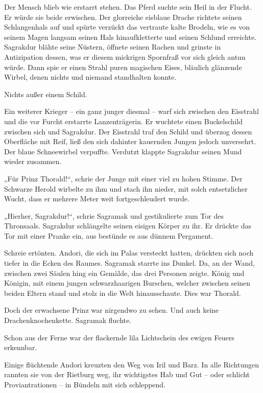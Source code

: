 Der Mensch blieb wie erstarrt stehen. Das Pferd suchte sein Heil in der Flucht. Er würde sie beide erwischen. Der glorreiche eisblaue Drache richtete seinen Schlangenhals auf und spürte verzückt das vertraute kalte Brodeln, wie es von seinem Magen langsam seinen Hals hinaufkletterte und seinen Schlund erreichte. Sagrakdur blähte seine Nüstern, öffnete seinen Rachen und grinste in Antizipation dessen, was er diesem mickrigen Spornfraß vor sich gleich antun würde. Dann spie er einen Strahl puren magischen Eises, bläulich glänzende Wirbel, denen nichts und niemand standhalten konnte.

Nichts außer einem Schild.

Ein weiterer Krieger – ein ganz junger diesmal – warf sich zwischen den Eisstrahl und die vor Furcht erstarrte Lanzenträgerin. Er wuchtete einen Buckelschild zwischen sich und Sagrakdur. Der Eisstrahl traf den Schild und überzog dessen Oberfläche mit Reif, ließ den sich dahinter kauernden Jungen jedoch unversehrt. Der blaue Schneewirbel verpuffte. Verdutzt klappte Sagrakdur seinen Mund wieder zusammen.

„Für Prinz Thorald!“, schrie der Junge mit einer viel zu hohen Stimme. Der Schwarze Herold wirbelte zu ihm und stach ihn nieder, mit solch entsetzlicher Wucht, dass er mehrere Meter weit fortgeschleudert wurde.

„Hierher, Sagrakdur!“, schrie Sagramak und gestikulierte zum Tor des Thronsaals. Sagrakdur schlängelte seinen eisigen Körper zu ihr. Er drückte das Tor mit einer Pranke ein, aus bestünde es aus dünnem Pergament.

Schreie ertönten. Andori, die sich im Palas versteckt hatten, drückten sich noch tiefer in die Ecken des Raumes. Sagramak starrte ins Dunkel. Da, an der Wand, zwischen zwei Säulen hing ein Gemälde, das drei Personen zeigte. König und Königin, mit einem jungen schwarzhaarigen Burschen, welcher zwischen seinen beiden Eltern stand und stolz in die Welt hinausschaute. Dies war Thorald.

Doch der erwachsene Prinz war nirgendwo zu sehen. Und auch keine Drachenknochenkette. Sagramak fluchte.



\trennzeichen



Schon aus der Ferne war der flackernde lila Lichtschein des ewigen Feuers erkennbar.

Einige flüchtende Andori kreuzten den Weg von Iril und Barz. In alle Richtungen rannten sie von der Rietburg weg, ihr wichtigstes Hab und Gut – oder schlicht Proviantrationen – in Bündeln mit sich schleppend.

